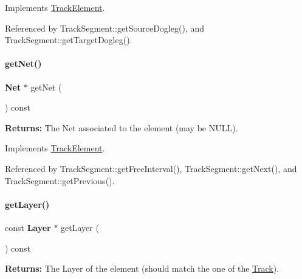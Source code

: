 Implements \mbox{\hyperlink{classKite_1_1TrackElement_ae35b78590ed6aa546b626ef95f28c533}{Track\+Element}}.



Referenced by Track\+Segment\+::get\+Source\+Dogleg(), and Track\+Segment\+::get\+Target\+Dogleg().

\mbox{\label{classKite_1_1TrackSegment_a692492374623a5c6096b2c4a51190359}} 
\paragraph{\texorpdfstring{get\+Net()}{getNet()}}
{\footnotesize\ttfamily \textbf{ Net} $\ast$ get\+Net (\begin{DoxyParamCaption}{ }\end{DoxyParamCaption}) const\hspace{0.3cm}{\ttfamily [virtual]}}

{\bfseries Returns\+:} The Net associated to the element (may be {\ttfamily N\+U\+LL}). 

Implements \mbox{\hyperlink{classKite_1_1TrackElement_a2b383a5b6f5028911a35e446a682dabd}{Track\+Element}}.



Referenced by Track\+Segment\+::get\+Free\+Interval(), Track\+Segment\+::get\+Next(), and Track\+Segment\+::get\+Previous().

\mbox{\label{classKite_1_1TrackSegment_ab045567c4f529dca7790d66c17c3084f}} 
\paragraph{\texorpdfstring{get\+Layer()}{getLayer()}}
{\footnotesize\ttfamily const \textbf{ Layer} $\ast$ get\+Layer (\begin{DoxyParamCaption}{ }\end{DoxyParamCaption}) const\hspace{0.3cm}{\ttfamily [virtual]}}

{\bfseries Returns\+:} The Layer of the element (should match the one of the \mbox{\hyperlink{classKite_1_1Track}{Track}}). 

